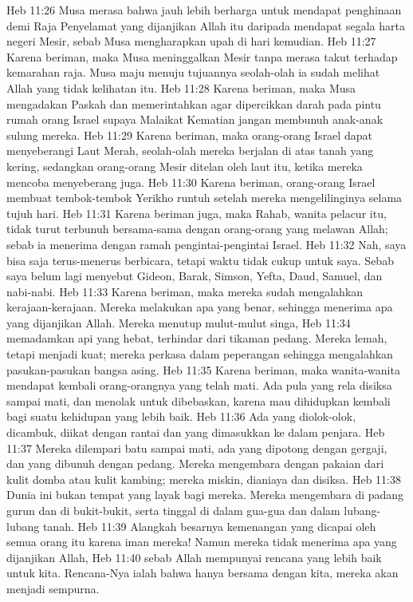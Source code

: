 Heb 11:26  Musa merasa bahwa jauh lebih berharga untuk mendapat penghinaan demi Raja Penyelamat yang dijanjikan Allah itu daripada mendapat segala harta negeri Mesir, sebab Musa mengharapkan upah di hari kemudian.
Heb 11:27  Karena beriman, maka Musa meninggalkan Mesir tanpa merasa takut terhadap kemarahan raja. Musa maju menuju tujuannya seolah-olah ia sudah melihat Allah yang tidak kelihatan itu.
Heb 11:28  Karena beriman, maka Musa mengadakan Paskah dan memerintahkan agar dipercikkan darah pada pintu rumah orang Israel supaya Malaikat Kematian jangan membunuh anak-anak sulung mereka.
Heb 11:29  Karena beriman, maka orang-orang Israel dapat menyeberangi Laut Merah, seolah-olah mereka berjalan di atas tanah yang kering, sedangkan orang-orang Mesir ditelan oleh laut itu, ketika mereka mencoba menyeberang juga.
Heb 11:30  Karena beriman, orang-orang Israel membuat tembok-tembok Yerikho runtuh setelah mereka mengelilinginya selama tujuh hari.
Heb 11:31  Karena beriman juga, maka Rahab, wanita pelacur itu, tidak turut terbunuh bersama-sama dengan orang-orang yang melawan Allah; sebab ia menerima dengan ramah pengintai-pengintai Israel.
Heb 11:32  Nah, saya bisa saja terus-menerus berbicara, tetapi waktu tidak cukup untuk saya. Sebab saya belum lagi menyebut Gideon, Barak, Simson, Yefta, Daud, Samuel, dan nabi-nabi.
Heb 11:33  Karena beriman, maka mereka sudah mengalahkan kerajaan-kerajaan. Mereka melakukan apa yang benar, sehingga menerima apa yang dijanjikan Allah. Mereka menutup mulut-mulut singa,
Heb 11:34  memadamkan api yang hebat, terhindar dari tikaman pedang. Mereka lemah, tetapi menjadi kuat; mereka perkasa dalam peperangan sehingga mengalahkan pasukan-pasukan bangsa asing.
Heb 11:35  Karena beriman, maka wanita-wanita mendapat kembali orang-orangnya yang telah mati. Ada pula yang rela disiksa sampai mati, dan menolak untuk dibebaskan, karena mau dihidupkan kembali bagi suatu kehidupan yang lebih baik.
Heb 11:36  Ada yang diolok-olok, dicambuk, diikat dengan rantai dan yang dimasukkan ke dalam penjara.
Heb 11:37  Mereka dilempari batu sampai mati, ada yang dipotong dengan gergaji, dan yang dibunuh dengan pedang. Mereka mengembara dengan pakaian dari kulit domba atau kulit kambing; mereka miskin, dianiaya dan disiksa.
Heb 11:38  Dunia ini bukan tempat yang layak bagi mereka. Mereka mengembara di padang gurun dan di bukit-bukit, serta tinggal di dalam gua-gua dan dalam lubang-lubang tanah.
Heb 11:39  Alangkah besarnya kemenangan yang dicapai oleh semua orang itu karena iman mereka! Namun mereka tidak menerima apa yang dijanjikan Allah,
Heb 11:40  sebab Allah mempunyai rencana yang lebih baik untuk kita. Rencana-Nya ialah bahwa hanya bersama dengan kita, mereka akan menjadi sempurna.

